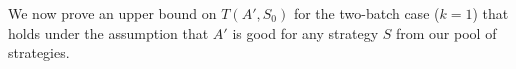 \documentclass[a4paper,11pt]{article}
\theoremstyle{definition}
\newcommand{\Ber}{\mathrm{Ber}}
\begin{document}
    


We now prove an upper bound on $T(A', S_0)$ for the two-batch case ($k=1$) that holds under the assumption that $A'$ is good for any strategy $S$ from our pool of strategies.
\end{document}
